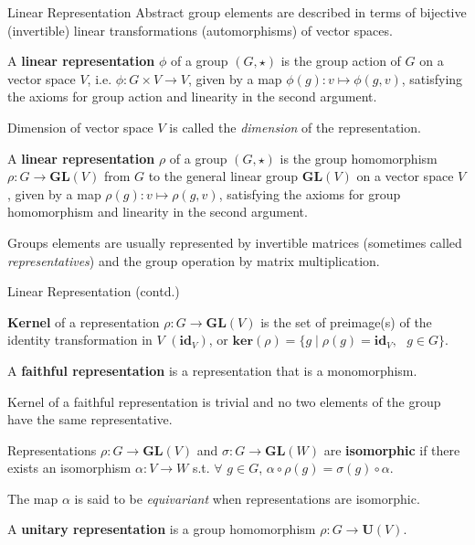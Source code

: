 \documentclass{beamer}
\newcommand\boldtext[1]{\textcolor{bolds}{\textbf{#1}}}
\newcommand\italictext[1]{\textcolor{italics}{\textit{#1}}}
\begin{document}
\begin{frame}{Linear Representation}
    Abstract group elements are described in terms of bijective (invertible) linear transformations (automorphisms) of vector spaces.
    \begin{definition}[1]
        A \boldtext{linear representation} $\phi$ of a group $(G,\star)$ is the group action of $G$ on a vector space $V$, i.e. $\phi:G\times V\xrightarrow{}V$, given by a map $\phi(g):v\mapsto\phi(g,v)$, satisfying the axioms for group action and linearity in the second argument.
    \end{definition}
    Dimension of vector space $V$ is called the \italictext{dimension} of the representation.
    \begin{definition}[2]
        A \boldtext{linear representation} $\rho$ of a group $(G,\star)$ is the group homomorphism $\rho:G\xrightarrow{}\mathbf{GL}(V)$ from $G$ to the general linear group $\mathbf{GL}(V)$ on a vector space $V$, given by a map $\rho(g):v\mapsto\rho(g,v)$, satisfying the axioms for group homomorphism and linearity in the second argument.
    \end{definition}
    Groups elements are usually represented by invertible matrices (sometimes called \italictext{representatives}) and the group operation by matrix multiplication.
\end{frame}

\begin{frame}{Linear Representation (contd.)}
    \begin{definition}
        \boldtext{Kernel} of a representation $\rho:G\xrightarrow{}\mathbf{GL}(V)$ is the set of preimage(s) of the identity transformation in $V$ $(\mathbf{id}_V)$, or $\mathbf{ker}(\rho)=\{g\mid \rho(g)=\mathbf{id}_V,\text{ } g\in G\}$.
    \end{definition}
    \begin{definition}
        A \boldtext{faithful representation} is a representation that is a monomorphism.
    \end{definition}
    Kernel of a faithful representation is trivial and no two elements of the group have the same representative.
    \begin{definition}
        Representations $\rho:G\xrightarrow{}\mathbf{GL}(V)$ and $\sigma:G\xrightarrow{}\mathbf{GL}(W)$ are \boldtext{isomorphic} if there exists an isomorphism $\alpha:V\xrightarrow{}W$ s.t. $\forall$ $g\in G$, $\alpha\circ\rho(g)=\sigma(g)\circ\alpha$.
    \end{definition}
    The map $\alpha$ is said to be \italictext{equivariant} when representations are isomorphic.
    \begin{definition}
        A \boldtext{unitary representation} is a group homomorphism $\rho:G\xrightarrow{}\mathbf{U}(V)$.
    \end{definition}
\end{frame}
\end{document}
